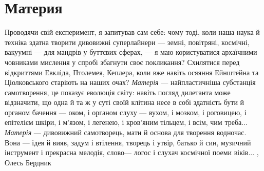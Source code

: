  
 
 
 
 
\chapter{Материя}
\label{sec:slova.materia}

Проводячи свій експеримент, я запитував сам себе: чому тоді, коли наша наука й
техніка здатна творити дивовижні суперлайнери — земні, повітряні, космічні,
вакуумні — для мандрів у буттєвих сферах, — я маю користуватися архаїчними
човниками мислення у спробі збагнути своє покликання? Схилятися перед
відкриттями Евкліда, Птолемея, Кеплера, коли вже навіть осяяння Ейнштейна та
Ціолковського старіють на наших очах?  \emph{Матерія} — найпластичніша
субстанція самотворення, це показує еволюція світу: навіть погляд дилетанта
може відзначити, що одна й та ж у суті своїй клітина несе в собі здатність бути
й органом бачення — оком, і органом слуху — вухом, і мозком, і роговицею, і
епітелієм шкіри, і м’язом, і легенею, і кров’яним тільцем, і всім, чим треба...
\emph{Матерія} — дивовижний самотворець, мати й основа для творення водночас.
Вона — ідея й вияв, задум і втілення, творець і утвір, батько й син, музичний
інструмент і прекрасна мелодія, слово— логос і слухач космічної поеми віків...
, Олесь Бердник
